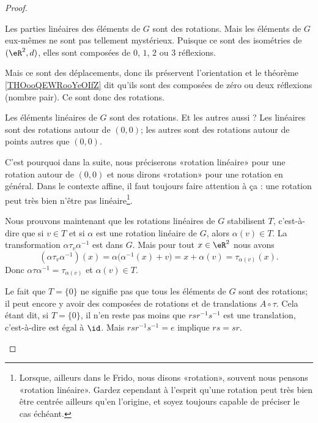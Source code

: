 \begin{proof}
\begin{subproof}

		Les parties linéaires des éléments de \( G\) sont des rotations. Mais les éléments de \( G\) eux-mêmes ne sont pas tellement mystérieux. Puisque ce sont des isométries de \( (\eR^2,d)\), elles sont composées de \( 0\), \( 1\), \( 2\) ou \( 3\) réflexions.

		Mais ce sont des déplacements, donc ils préservent l'orientation et le théorème \ref{THOooQEWRooYeOIfZ} dit qu'ils sont des composées de zéro ou deux réflexions (nombre pair). Ce sont donc des rotations.

		\spitem[Hein ?]
		Les éléments linéaires de \( G\) sont des rotations. Et les autres aussi ? Les linéaires sont des rotations autour de \( (0,0)\); les autres sont des rotations autour de points autres que \( (0,0)\).

		C'est pourquoi dans la suite, nous préciserons «rotation linéaire» pour une rotation autour de \( (0,0)\) et nous dirons «rotation» pour une rotation en général. Dans le contexte affine, il faut toujours faire attention à ça : une rotation peut très bien n'être pas linéaire\footnote{Lorsque, ailleurs dans le Frido, nous disons «rotation», souvent nous pensons «rotation linéaire». Gardez cependant à l'esprit qu'une rotation peut très bien être centrée ailleurs qu'en l'origine, et soyez toujours capable de préciser le cas échéant.}.

		Nous prouvons maintenant que les rotations linéaires de \( G\) stabilisent \( T\), c'est-à-dire que si \( v\in T\) et si \( \alpha\) est une rotation linéaire de \( G\), alors \( \alpha(v)\in T\). La transformation \( \alpha\tau_v\alpha^{-1}\) est dans \( G\). Mais pour tout \( x\in \eR^2\) nous avons
		\begin{equation}        \label{EQooLLZVooUuabir}
			(\alpha\tau_v\alpha^{-1})(x)=\alpha\big( \alpha^{-1}(x)+v \big)=x+\alpha(v)=\tau_{\alpha(v)}(x).
		\end{equation}
		Donc \( \alpha\tau\alpha^{-1}=\tau_{\alpha(v)}\) et \( \alpha(v)\in T\).

		\spitem[Exclusion de \( T=\{ 0 \}\)]
		Le fait que \( T=\{ 0 \}\) ne signifie pas que tous les éléments de \( G\) sont des rotations; il peut encore y avoir des composées de rotations et de translations \( A\circ \tau\). Cela étant dit, si \( T=\{ 0 \}\), il n'en reste pas moins que \( rsr^{-1}s^{-1}\) est une translation, c'est-à-dire est égal à \( \id\). Mais \( rsr^{-1}s^{-1}=e\) implique \( rs=sr\).


\end{subproof}
\end{proof}
